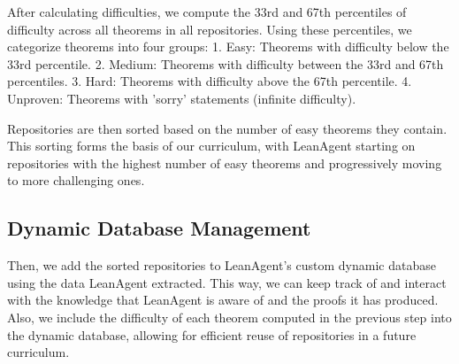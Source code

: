 \documentclass{article} %
\begin{document}
After calculating difficulties, we compute the 33rd and 67th percentiles of difficulty across all theorems in all repositories. Using these percentiles, we categorize theorems into four groups: 1. Easy: Theorems with difficulty below the 33rd percentile. 2. Medium: Theorems with difficulty between the 33rd and 67th percentiles. 3. Hard: Theorems with difficulty above the 67th percentile. 4. Unproven: Theorems with 'sorry' statements (infinite difficulty).


Repositories are then sorted based on the number of easy theorems they contain. This sorting forms the basis of our curriculum, with LeanAgent starting on repositories with the highest number of easy theorems and progressively moving to more challenging ones.

\subsection{Dynamic Database Management}

Then, we add the sorted repositories to LeanAgent's custom dynamic database using the data LeanAgent extracted. This way, we can keep track of and interact with the knowledge that LeanAgent is aware of and the proofs it has produced. Also, we include the difficulty of each theorem computed in the previous step into the dynamic database, allowing for efficient reuse of repositories in a future curriculum.


\end{document}
